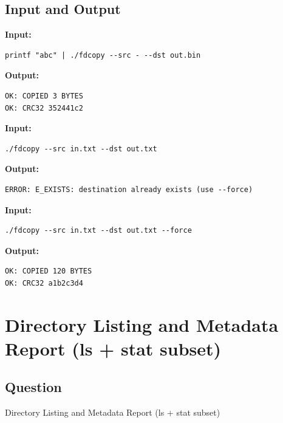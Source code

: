 \documentclass[12pt,a4paper]{article}
\begin{document}
\subsection{Input and Output}

\noindent\textbf{Input:}
\begin{verbatim}
printf "abc" | ./fdcopy --src - --dst out.bin
\end{verbatim}

\vspace{0.5cm}

\noindent\textbf{Output:}
\begin{verbatim}
OK: COPIED 3 BYTES
OK: CRC32 352441c2
\end{verbatim}


\noindent\textbf{Input:}
\begin{verbatim}
./fdcopy --src in.txt --dst out.txt

\end{verbatim}

\vspace{0.5 cm}

\noindent\textbf{Output:}
\begin{verbatim}
ERROR: E_EXISTS: destination already exists (use --force)
\end{verbatim}
\vspace{.5 cm}

\noindent\textbf{Input:}
\begin{verbatim}
./fdcopy --src in.txt --dst out.txt --force

\end{verbatim}

\vspace{0.5cm}

\noindent\textbf{Output:}
\begin{verbatim}
OK: COPIED 120 BYTES
OK: CRC32 a1b2c3d4

\end{verbatim}
\newpage


\section{Directory Listing and Metadata Report (ls + stat subset)}
\subsection{Question}
Directory Listing and Metadata Report (ls + stat subset)
\end{document}
